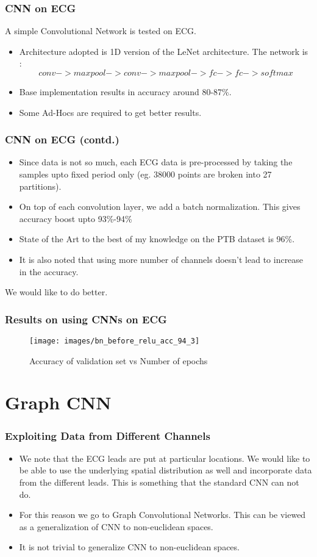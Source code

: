 \documentclass{beamer}
\begin{document}
\begin{frame}
  \frametitle{CNN on ECG}
  A simple Convolutional Network is tested on ECG.
  \begin{itemize}
  \item Architecture adopted is 1D version of the LeNet architecture. The network is :
    $$conv -> max pool -> conv -> max pool -> fc -> fc -> softmax$$
  \item Base implementation results in accuracy around 80-87\%.
  \item Some Ad-Hocs are required to get better results.
  \end{itemize}
\end{frame}

\begin{frame}
  \frametitle{CNN on ECG (contd.)}
  \begin{itemize}
  \item Since data is not so much, each ECG data is pre-processed by taking the samples upto fixed period only (eg. 38000 points are broken into 27 partitions).
  \item On top of each convolution layer, we add a batch normalization. This gives accuracy boost upto 93\%-94\%
  \item State of the Art to the best of my knowledge on the PTB dataset is 96\%.
  \item It is also noted that using more number of channels doesn't lead to increase in the accuracy.
  \end{itemize}
  We would like to do better.
\end{frame}

\begin{frame}
  \frametitle{Results on using CNNs on ECG}
  \begin{figure}[H]
    \centering
    \texttt{[image: images/bn\_before\_relu\_acc\_94\_3]}
    \caption{Accuracy of validation set vs Number of epochs}
    \label{fig:1}
  \end{figure}
\end{frame}

\section{Graph CNN}
\begin{frame}
  \frametitle{Exploiting Data from Different Channels}
  \begin{itemize}
  \item We note that the ECG leads are put at particular locations. We would like to be able to use the underlying spatial distribution as well and incorporate data from the different leads. This is something that the standard CNN can not do.
  \item For this reason we go to Graph Convolutional Networks. This can be viewed as a generalization of CNN to non-euclidean spaces.
  \item It is not trivial to generalize CNN to non-euclidean spaces.
  \end{itemize}
\end{frame}
\end{document}
